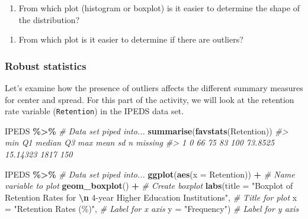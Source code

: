 \documentclass[
]{report}
\newenvironment{Shaded}{\begin{snugshade}}{\end{snugshade}}
\newcommand{\AttributeTok}[1]{\textcolor[rgb]{0.13,0.29,0.53}{#1}}
\newcommand{\CommentTok}[1]{\textcolor[rgb]{0.56,0.35,0.01}{\textit{#1}}}
\newcommand{\FunctionTok}[1]{\textcolor[rgb]{0.13,0.29,0.53}{\textbf{#1}}}
\newcommand{\NormalTok}[1]{#1}
\newcommand{\SpecialCharTok}[1]{\textcolor[rgb]{0.81,0.36,0.00}{\textbf{#1}}}
\newcommand{\StringTok}[1]{\textcolor[rgb]{0.31,0.60,0.02}{#1}}
\providecommand{\tightlist}{%
  \setlength{\itemsep}{0pt}\setlength{\parskip}{0pt}}
\begin{document}
\vspace{0.4in}

\begin{enumerate}
\def\labelenumi{\arabic{enumi}.}
\setcounter{enumi}{8}
\tightlist
\item
  From which plot (histogram or boxplot) is it easier to determine the shape of the distribution?
\end{enumerate}

\vspace{0.3in}

\begin{enumerate}
\def\labelenumi{\arabic{enumi}.}
\setcounter{enumi}{9}
\tightlist
\item
  From which plot is it easier to determine if there are outliers?
\end{enumerate}

\vspace{0.3in}

\subsubsection*{Robust statistics}\label{robust-statistics}

Let's examine how the presence of outliers affects the different summary measures for center and spread. For this part of the activity, we will look at the retention rate variable (\texttt{Retention}) in the IPEDS data set.

\begin{Shaded}
\begin{Highlighting}[]
\NormalTok{IPEDS }\SpecialCharTok{\%\textgreater{}\%} \CommentTok{\# Data set piped into...}
    \FunctionTok{summarise}\NormalTok{(}\FunctionTok{favstats}\NormalTok{(Retention))}
\CommentTok{\#\textgreater{}   min Q1 median Q3 max    mean       sd    n missing}
\CommentTok{\#\textgreater{} 1   0 66     75 83 100 73.8525 15.14323 1817     150}

\NormalTok{IPEDS }\SpecialCharTok{\%\textgreater{}\%} \CommentTok{\# Data set piped into...}
    \FunctionTok{ggplot}\NormalTok{(}\FunctionTok{aes}\NormalTok{(}\AttributeTok{x =}\NormalTok{ Retention)) }\SpecialCharTok{+} \CommentTok{\# Name variable to plot}
    \FunctionTok{geom\_boxplot}\NormalTok{() }\SpecialCharTok{+} \CommentTok{\# Create boxplot }
    \FunctionTok{labs}\NormalTok{(}\AttributeTok{title =} \StringTok{"Boxplot of Retention Rates for }\SpecialCharTok{\textbackslash{}n}\StringTok{ 4{-}year Higher Education Institutions"}\NormalTok{,}
           \CommentTok{\# Title for plot}
         \AttributeTok{x =} \StringTok{"Retention Rates (\%)"}\NormalTok{, }\CommentTok{\# Label for x axis}
         \AttributeTok{y =} \StringTok{"Frequency"}\NormalTok{) }\CommentTok{\# Label for y axis}
\end{Highlighting}
\end{Shaded}
\end{document}
